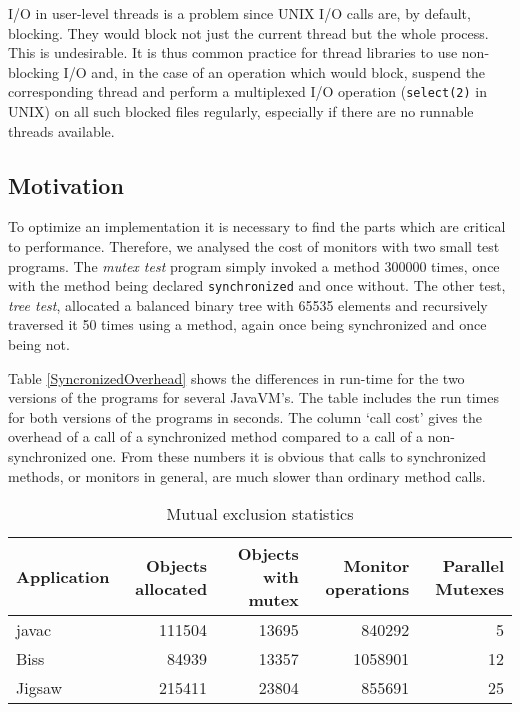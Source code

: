 I/O in user-level threads is a problem since UNIX I/O calls are, by
default, blocking. They would block not just the current thread but
the whole process. This is undesirable. It is thus common practice for
thread libraries to use non-blocking I/O and, in the case of an
operation which would block, suspend the corresponding thread and
perform a multiplexed I/O operation (\texttt{select(2)} in UNIX) on
all such blocked files regularly, especially if there are no runnable
threads available.


\subsection{Motivation}

\label{MonitorTest}

To optimize an implementation it is necessary to find the parts which
are critical to performance. Therefore, we analysed the cost of
monitors with two small test programs.  The {\em mutex test} program
simply invoked a method 300000 times, once with the method being
declared \texttt{synchronized} and once without. The other test, {\em
tree test}, allocated a balanced binary tree with 65535 elements and
recursively traversed it 50 times using a method, again once being
synchronized and once being not.

Table \ref{SyncronizedOverhead} shows the differences in run-time for
the two versions of the programs for several JavaVM's. The table
includes the run times for both versions of the programs in seconds.
The column `call cost' gives the overhead of a call of a synchronized
method compared to a call of a non-synchronized one. From these
numbers it is obvious that calls to synchronized methods, or monitors
in general, are much slower than ordinary method calls.

\begin{table*}
\begin{center}
\begin{tabular}{|l|r|r|r|r|} \hline
Application & Objects allocated & Objects with mutex & Monitor
operations & Parallel Mutexes \\ \hline\hline
javac       & 111504            & 13695              &
840292             & 5        \\ \hline
Biss        & 84939             & 13357              &
1058901            & 12       \\ \hline
Jigsaw      & 215411            & 23804              &
855691             & 25       \\ \hline
\end{tabular}
\caption{Mutual exclusion statistics}
\label{MutexStatistics}
\end{center}
\end{table*}

